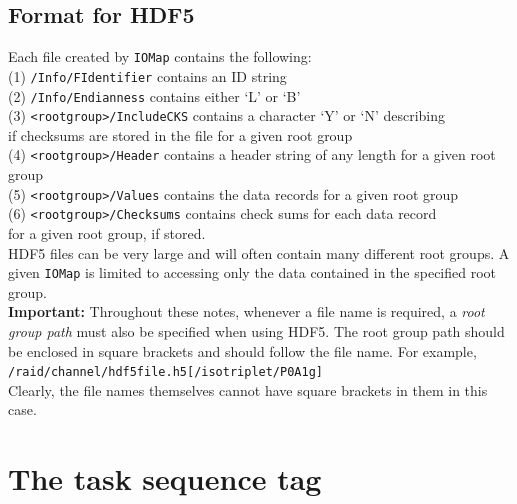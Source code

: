 \documentclass[12pt]{article}
\newcommand{\vb}{\texttt}
\begin{document}
\subsection{Format for HDF5}
Each file created by \vb{IOMap} contains the following:\\
\hspace*{20pt}(1) \vb{/Info/FIdentifier} contains an ID string\\
\hspace*{20pt}(2) \vb{/Info/Endianness} contains either `L' or `B'\\
\hspace*{20pt}(3) \vb{<rootgroup>/IncludeCKS} contains a character `Y' or `N' 
     describing\\ \hspace*{60pt}if checksums are stored in the file for a given root group \\
\hspace*{20pt}(4) \vb{<rootgroup>/Header} contains a header string of any length
   for a given root group\\
\hspace*{20pt}(5) \vb{<rootgroup>/Values} contains the data records for a given root group  \\
\hspace*{20pt}(6) \vb{<rootgroup>/Checksums} contains check sums for each data
   record\\ \hspace*{60pt} for a given root group, if stored.\\
HDF5 files can be very large and will often contain many different root groups.  
A given \vb{IOMap} is limited to accessing only the data contained in the 
specified root group.\\

\textbf{Important:} Throughout these notes, whenever a file name is required,
a \textit{root group path} must also be specified when using HDF5.  The
root group path should be enclosed in square brackets and should follow
the file name.  For example,\\
\hspace*{20pt}\vb{/raid/channel/hdf5file.h5[/isotriplet/P0A1g]}\\
Clearly, the file names themselves cannot have square brackets in them 
in this case.

\section{The task sequence tag}
\end{document}
